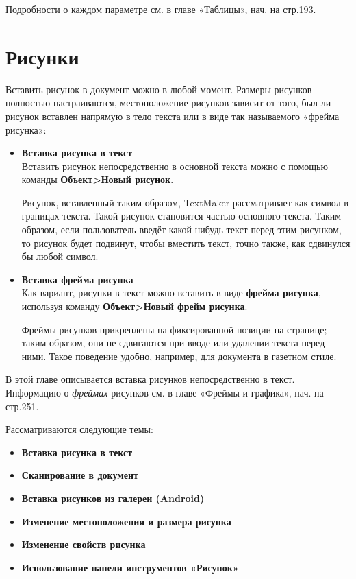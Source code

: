 \documentclass[a4paper,10pt]{article}
\begin{document}
Подробности о каждом параметре см. в главе «Таблицы», нач. на стр.193.

\section{Рисунки}
Вставить рисунок в документ можно в любой момент. Размеры рисунков полностью настраиваются, местоположение рисунков зависит от того, был ли рисунок вставлен напрямую в тело текста или в виде так называемого «фрейма рисунка»:

\begin{itemize}
 \item \textbf{Вставка рисунка в текст}\\
 Вставить рисунок непосредственно в основной текста можно с помощью команды \textbf{Объект>Новый рисунок}.
 
 Рисунок, вставленный таким образом, TextMaker рассматривает как символ в границах текста. Такой рисунок становится частью основного текста. Таким образом, если пользователь введёт какой-нибудь текст перед этим рисунком, то рисунок будет подвинут, чтобы вместить текст, точно также, как сдвинулся бы любой символ.
 \item \textbf{Вставка фрейма рисунка}\\
 Как вариант, рисунки в текст можно вставить в виде \textbf{фрейма рисунка}, используя команду \textbf{Объект>Новый фрейм рисунка}.
 
 Фреймы рисунков прикреплены на фиксированной позиции на странице; таким образом, они не сдвигаются при вводе или удалении текста перед ними. Такое поведение удобно, например, для документа в газетном стиле.
\end{itemize}

В этой главе описывается вставка рисунков непосредственно в текст. Информацию о \textit{фреймах} рисунков см. в главе «Фреймы и графика», нач. на стр.251.

Рассматриваются следующие темы:

\begin{itemize}
 \item \textbf{Вставка рисунка в текст}
 \item \textbf{Сканирование в документ}
 \item \textbf{Вставка рисунков из галереи (Android)}
 \item \textbf{Изменение местоположения и размера рисунка}
 \item \textbf{Изменение свойств рисунка}
 \item \textbf{Использование панели инструментов «Рисунок»}
\end{itemize}
\end{document}
